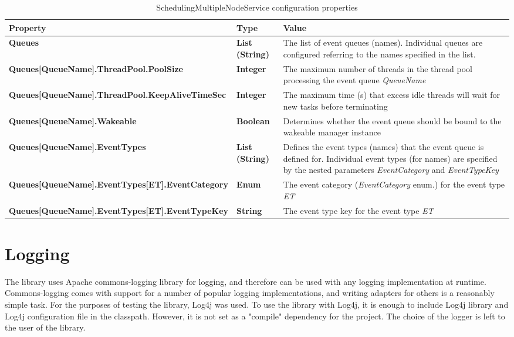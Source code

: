 \begin{table}
\scriptsize
\begin{center}
\begin{tabular}{p{6.3cm} p{0.9cm} p{7.3cm}}
	\hline
	\textbf{Property}											& \textbf{Type}						& \textbf{Value}					\\[1mm]
    \hline
	\textbf{Queues}												& \textbf{List (String)}			& The list of event queues (names). Individual queues are configured referring to the names specified in the list.		\\[1.5mm]	
	\textbf{Queues[QueueName].ThreadPool.PoolSize}				& \textbf{Integer}					& The maximum number of threads in the thread pool processing the event queue \emph{QueueName}		\\[1.5mm]	
	\textbf{Queues[QueueName].ThreadPool.KeepAliveTimeSec}		& \textbf{Integer}					& The maximum time (s) that excess idle threads will wait for new tasks before terminating			\\[1.5mm]	
	\textbf{Queues[QueueName].Wakeable}							& \textbf{Boolean}					& Determines whether the event queue should be bound to the wakeable manager instance					\\[1.5mm]	
	\textbf{Queues[QueueName].EventTypes}						& \textbf{List (String)}			& Defines the event types (names) that the event queue is defined for. Individual event types (for names) are specified by the nested parameters \emph{EventCategory} and \emph{EventTypeKey}			\\[1.5mm]	
	\textbf{Queues[QueueName].EventTypes[ET].EventCategory}		& \textbf{Enum}					& The event category (\emph{EventCategory} enum.) for the event type \emph{ET}						\\[1.5mm]	
	\textbf{Queues[QueueName].EventTypes[ET].EventTypeKey}		& \textbf{String}					& The event type key for the event type \emph{ET}						\\[1.5mm]	
    \hline
\end{tabular}
\end{center}
\caption{SchedulingMultipleNodeService configuration properties}
\label{tab:libSchedulingMultipleNodeService}
\end{table}




\section{Logging}

The library uses Apache commons-logging library for logging, and therefore can be used with any logging implementation at runtime. Commons-logging comes with support for a number of popular logging implementations, and writing adapters for others is a reasonably simple task. For the purposes of testing the library, Log4j was used. To use the library with Log4j, it is enough to include Log4j library and Log4j configuration file in the classpath. However, it is not set as a "compile" dependency for the project. The choice of the logger is left to the user of the library.





